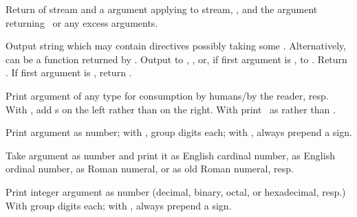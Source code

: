 \begin{LIST}{1cm}

  {
  Return  of stream and a  argument applying  to
  stream, , and the  argument
  returning \NIL\ or any excess arguments. 
  }

  {
  Output string  which may
  contain \kwd{\TLD} directives possibly taking some
  . Alternatively,  can be a function returned
  by .
  Output to , , or, if first
  argument is \T, to . Return \retval{\NIL}. If
  first argument is \NIL, return . 
  }

  \begin{LIST}{.5cm}

    {
    Print argument of any type for consumption by humans/by the
    reader, resp. With , add s on the left
    rather than on the right. With \kwd{:} print \NIL\ as \LIT{()} rather
    than .
  }

    {
    Print argument as number; with \KWD{:}, group digits 
     each; with , always prepend a sign.
  }

    {
    Take argument as number and print it as English cardinal number,
    as English ordinal number, as Roman numeral, or as old Roman
    numeral, resp.
  }

    {
    Print integer argument as number (decimal, binary, octal, or
    hexadecimal, resp.) With \kwd{:} group digits 
     each; with , always prepend a sign.
  }


\end{LIST}
\end{LIST}
